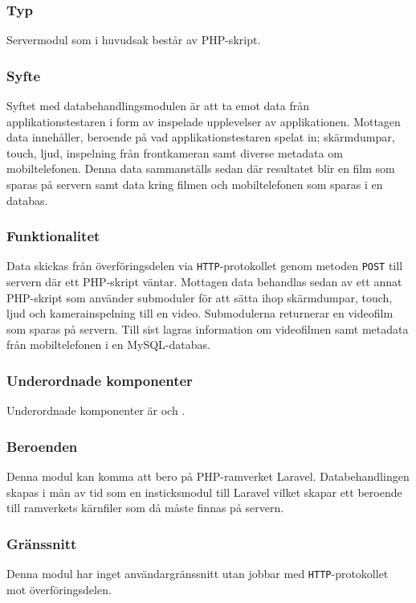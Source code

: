 \subsubsection{Typ}
Servermodul som i huvudsak består av PHP-skript.

\subsubsection{Syfte}
Syftet med databehandlingsmodulen är att ta emot data från applikationstestaren i form av inspelade upplevelser av applikationen. Mottagen data innehåller, beroende på vad applikationstestaren spelat in; skärmdumpar, touch, ljud, inspelning från frontkameran samt diverse metadata om mobiltelefonen. Denna data sammanställs sedan där resultatet blir en film som sparas på servern samt data kring filmen och mobiltelefonen som sparas i en databas.

\subsubsection{Funktionalitet}
Data skickas från överföringsdelen via \texttt{HTTP}-protokollet genom metoden \texttt{POST} till servern där ett PHP-skript väntar. Mottagen data behandlas sedan av ett annat PHP-skript som använder submoduler för att sätta ihop skärmdumpar, touch, ljud och kamerainspelning till en video. Submodulerna returnerar en videofilm som sparas på servern. Till sist lagras information om videofilmen samt metadata från mobiltelefonen i en MySQL-databas.

\subsubsection{Underordnade komponenter}
Underordnade komponenter är  och .

\subsubsection{Beroenden}
Denna modul kan komma att bero på PHP-ramverket Laravel. Databehandlingen skapas i mån av tid som en insticksmodul till Laravel vilket skapar ett beroende till ramverkets kärnfiler som då måste finnas på servern.

\subsubsection{Gränssnitt}
Denna modul har inget användargränssnitt utan jobbar med \texttt{HTTP}-protokollet mot överföringsdelen.


